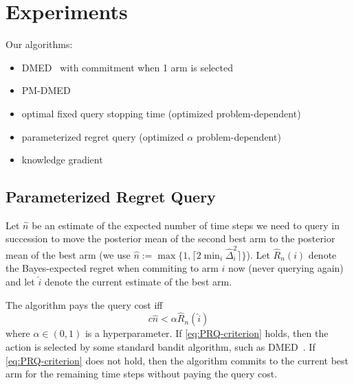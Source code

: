 \documentclass[a4paper]{article}
\begin{document}
\section{Experiments}

Our algorithms:
\begin{itemize}
\item DMED~\citep{Honda10} with commitment when 1 arm is selected
\item PM-DMED~\citep{Komiyama15}
\item optimal fixed query stopping time (optimized problem-dependent)
\item parameterized regret query (optimized $\alpha$ problem-dependent)
\item knowledge gradient
\end{itemize}

\iffalse
Problems:
* medium query cost c = 2 (>> gap)
  * horizon n = 10k vs gap 0.1 (< n^2/3)
  * horizon n = 1k vs gap 0.1 (~ n^2/3)
  * horizon n = 10k vs gap 0.01 (don't identify the arms)
* high query cost c = 50
  * horizon n = 10k vs gap 0.3 (pay to identify)
  * horizon n = 10k vs gap 0.1 (borderline case)
  * horizon n = 10k vs gap 0.05 (do not pay to identify)
* low query cost c = 0.01 (c << gap)
  * horizon n = 10k vs gap 0.1 (should almost always find the best arm)
  * horizon n = 200 vs gap 0.1 (query all the way?)

Also: plot regret vs different query stopping times and different alpha
\fi


\subsection{Parameterized Regret Query}

Let $\hat{n}$ be an estimate of the expected number of time steps
we need to query in succession to move the posterior mean of the second best arm to the posterior mean of the best arm
(we use $\hat{n} := \max\{ 1, \lceil 2\min_i \hat{\Delta}_i^2 \rceil \}$).
Let $\hat{R}_n(i)$ denote the Bayes-expected regret
when commiting to arm $i$ now (never querying again) and
let $\hat{i}$ denote the current estimate of the best arm.

The algorithm pays the query cost iff
\begin{equation}\label{eq:PRQ-criterion}
c\hat{n} < \alpha \hat{R}_n(\hat{i})
\end{equation}
where $\alpha \in (0, 1)$ is a hyperparameter.
If \eqref{eq:PRQ-criterion} holds,
then the action is selected by some standard bandit algorithm,
such as DMED~\citep{Honda10}.
If \eqref{eq:PRQ-criterion} does not hold,
then the algorithm commits to the current best arm for the remaining time steps without paying the query cost.
\end{document}
